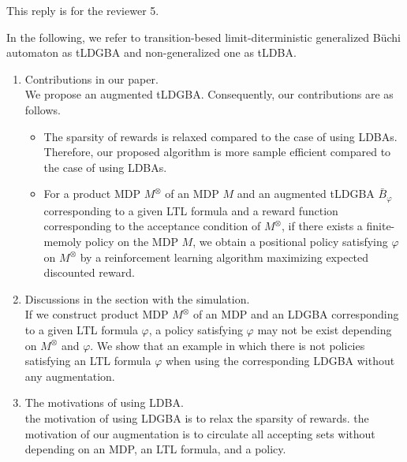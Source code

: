 \documentclass[10 pt, dvipdfmx]{article}
\theoremstyle{definition}
\begin{document}
This reply is for the reviewer 5.

In the following, we refer to transition-besed limit-diterministic generalized B\"{u}chi automaton as tLDGBA and non-generalized one as tLDBA.

\begin{enumerate}
  \item Contributions in our paper. \\
  We propose an augmented tLDGBA. Consequently, our contributions are as follows.

  \begin{itemize}
    \item  The sparsity of rewards is relaxed compared to the case of using LDBAs. Therefore, our proposed algorithm is more sample efficient compared to the case of using LDBAs.

    \item For a product MDP $M^{\otimes}$ of an MDP $M$ and an augmented tLDGBA $\bar{B}_{\varphi}$ corresponding to a given LTL formula and a reward function corresponding to the acceptance condition of $M^{\otimes}$, if there exists a finite-memoly policy on the MDP $M$, we obtain a positional policy satisfying $\varphi$ on $M^{\otimes}$ by a reinforcement learning algorithm maximizing expected discounted reward.

  \end{itemize}

  \item Discussions in the section with the simulation. \\
  If we construct product MDP $M^{\otimes}$ of an MDP and an LDGBA corresponding to a given LTL formula $\varphi$, a policy satisfying $\varphi$ may not be exist depending on $M^{\otimes}$ and $\varphi$. We show that an example in which there is not policies satisfying an LTL formula $\varphi$ when using the corresponding LDGBA without any augmentation.

  \item The motivations of using LDBA. \\
  the motivation of using LDGBA is to relax the sparsity of rewards. the motivation of our augmentation is to circulate all accepting sets without depending on an MDP, an LTL formula, and a policy.


\end{enumerate}
\end{document}
